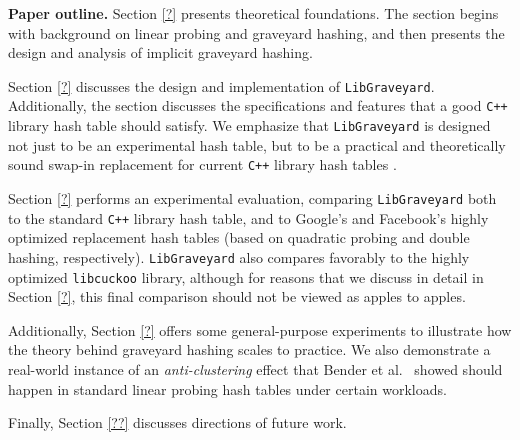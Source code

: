 \documentclass[10pt]{article}
\theoremstyle{remark}
\theoremstyle{remark}
\renewcommand{\paragraph}[1]{\vspace{.2 cm} \noindent \textbf{#1}}
\begin{document}
\paragraph{Paper outline.}
Section \ref{?} presents theoretical foundations. The section begins with background on linear probing and graveyard hashing, and then presents the design and analysis of implicit graveyard hashing.

Section \ref{?} discusses the design and implementation of \texttt{LibGraveyard}. Additionally, the section discusses the specifications and features that a good \texttt{C++} library hash table should satisfy. We emphasize that \texttt{LibGraveyard} is designed not just to be an experimental hash table, but to be a practical and theoretically sound swap-in replacement for current \texttt{C++} library hash tables \cite{??}.

Section \ref{?} performs an experimental evaluation, comparing \texttt{LibGraveyard} both to the standard \texttt{C++} library hash table, and to Google's and Facebook's highly optimized replacement hash tables (based on quadratic probing and double hashing, respectively). \texttt{LibGraveyard} also compares favorably to the highly optimized \texttt{libcuckoo} library, although for reasons that we discuss in detail in Section \ref{?}, this final comparison should not be viewed as apples to apples. 

Additionally, Section \ref{?} offers some general-purpose experiments to illustrate how the theory behind graveyard hashing scales to practice. We also demonstrate a real-world instance of an \emph{anti-clustering} effect that Bender et al.~\cite{?} showed should happen in standard linear probing hash tables under certain workloads. 

Finally, Section \ref{??} discusses directions of future work.

\newpage
\end{document}
